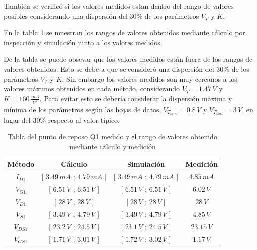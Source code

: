 \documentclass[10pt,spanish,a4paper,notitlepage]{article}
\begin{document}
También se verificó si los valores medidos estan dentro del rango de valores
posibles considerando una dispersión del $30\%$ de los parámetros $V_T$ y $K$.

En la tabla \ref{table:B_Q1_rango} se muestran los rangos de valores obtenidos
mediante cálculo por inspección y simulación junto a los valores medidos.

De la tabla se puede obsevar que los valores medidos están fuera de los rangos
de valores obtenidos. Esto se debe a que se consideró una dispersión del $30\%$
de los parámetros $V_T$ y $K$. Sin embargo los valores medidos son muy cercanos
a los valores máximos obtenidos en cada método, considerando $V_T = 1.47\,\unit{V}$ y 
$K = 160\,\unit{\frac{mA}{V^2}}$.
Para evitar esto se debería considerar la dispersión máxima y mínima de los
parámetros según las hojas de datos, $V_{T_{min}} = 0.8\,\unit{V}$ y $V_{T_{max}} = 3\,\unit{V}$,
en lugar del $30\%$ respecto al valor tipico.


\begin{table}[H]
\centering
\begin{tabular}{|c|c|c||c|} %
\hline
Método & Cálculo &  Simulación & Medición 
\\ \hline
$I_{D1}$ & [ $3.49\,\unit{mA}$ ; $4.79\,\unit{mA}$ ]  &  [ $3.49\,\unit{mA}$ ; $4.79\,\unit{mA}$ ] & $4.85\,\unit{mA}$
\\ \hline
$V_{G1}$ & [ $6.51\,\unit{V}$ ; $6.51\,\unit{V}$ ] & [ $6.51\,\unit{V}$ ; $6.51\,\unit{V}$ ] & $6.02\,\unit{V}$  
\\ \hline
$V_{D1}$ & [ $28\,\unit{V}$ ; $28\,\unit{V}$ ] & [ $28\,\unit{V}$ ; $28\,\unit{V}$ ] & $28\,\unit{V}$  
\\ \hline
$V_{S1}$ & [ $3.49\,\unit{V}$ ; $4.79\,\unit{V}$ ] & [ $3.49\,\unit{V}$ ; $4.79\,\unit{V}$ ] & $4.85\,\unit{V}$  
\\ \hline
$V_{DS1}$ & [ $23.2\,\unit{V}$ ; $24.5\,\unit{V}$ ] & [ $23.1\,\unit{V}$ ; $24.5\,\unit{V}$ ] & $23.15\,\unit{V}$  
\\ \hline
$V_{GS1}$ & [ $1.71\,\unit{V}$ ; $3.01\,\unit{V}$ ] & [ $1.72\,\unit{V}$ ; $3.02\,\unit{V}$ ] & $1.17\,\unit{V}$  
\\ \hline
\end{tabular}
\caption{Tabla del punto de reposo Q1 medido y el rango de valores obtenido mediante cálculo y medición}
\label{table:B_Q1_rango}
\end{table}
\end{document}
